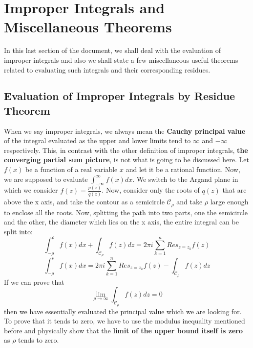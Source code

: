 \documentclass[11pt]{article}
\begin{document}
\begin{sloppypar}
\section{Improper Integrals and Miscellaneous Theorems}

In this last section of the document, we shall deal with the evaluation of improper integrals and also we shall state a few miscellaneous useful theorems related to evaluating such integrals and their corresponding residues. 

\subsection{Evaluation of Improper Integrals by Residue Theorem}
When we say improper integrals, we always mean the \textbf{Cauchy principal value} of the integral evaluated as the upper and lower limits tend to $\infty$ and $-\infty$ respectively. This, in contrast with the other definition of improper integrals, \textbf{the converging partial sum picture}, is not what is going to be discussed here. Let $f(x)$ be a function of a real variable $x$ and let it be a rational function. Now, we are supposed to evaluate $\int_{-\infty}^{\infty} f(x)dx$. We switch to the Argand plane in which we consider $f(z) = \frac{p(z)}{q(z)}$. Now, consider only the roots of $q(z)$ that are above the x axis, and take the contour as a semicircle $\mathcal{C}_\rho$ and take $\rho$ large enough to enclose all the roots. Now, splitting the path into two parts, one the semicircle and the other, the diameter which lies on the x axis, the entire integral can be split into:
$$\int_{-\rho}^{\rho}f(x)dx + \int_{\mathcal{C}_{\rho}}f(z)dz  = 2\pi i\sum_{k=1}^{n}Res_{z=z_{k}}f(z)$$
$$\int_{-\rho}^{\rho}f(x)dx   = 2\pi i\sum_{k=1}^{n}Res_{z=z_{k}}f(z) -  \int_{\mathcal{C}_{\rho}}f(z)dz$$
If we can prove that $$\lim_{\rho\to\infty}\int_{\mathcal{C}_{\rho}}f(z)dz = 0$$ then we have essentially evaluated the principal value which we are looking for. To prove that it tends to zero, we have to use the modulus inequality mentioned before and physically show that the \textbf{limit of the upper bound itself is zero} as $\rho$ tends to zero.


\end{sloppypar}
\end{document}
